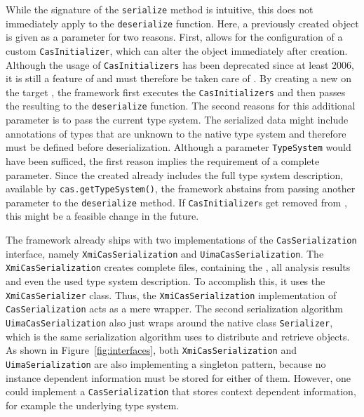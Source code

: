 While the signature of the \lstinline|serialize| method is intuitive, this does not immediately apply to the \lstinline|deserialize| function. Here, a previously created \cas{} object is given as a parameter for two reasons. First, \uima{} allows for the configuration of a custom \lstinline|CasInitializer|, which can alter the \cas{} object immediately after creation. Although the usage of \lstinline|CasInitializers| has been deprecated since at least 2006, it is still a feature of \uima{} and must therefore be taken care of \cite{uimacpe}. By creating a new \cas{} on the target \jvm{}, the framework first executes the \lstinline|CasInitializers| and then passes the resulting \cas{} to the \lstinline|deserialize| function. The second reasons for this additional parameter is to pass the current \uima{} type system. The serialized data might include annotations of types that are unknown to the native \uima{} type system and therefore must be defined before deserialization. Although a parameter \lstinline|TypeSystem| would have been sufficed, the first reason implies the requirement of a complete \cas{} parameter. Since the created \cas{} already includes the full type system description, available by \lstinline|cas.getTypeSystem()|, the framework abstains from passing another parameter to the \lstinline|deserialize| method. If \lstinline|CasInitializer|s get removed from \uima{}, this might be a feasible change in the future.

The framework already ships with two implementations of the \lstinline|CasSerialization| interface, namely \lstinline|XmiCasSerialization| and \lstinline|UimaCasSerialization|. The \lstinline|XmiCasSerialization| creates complete \xmi{} files, containing the \sofa{}, all analysis results and even the used type system description. To accomplish this, it uses the \uima{} \lstinline|XmiCasSerializer| class. Thus, the \lstinline|XmiCasSerialization| implementation of \lstinline|CasSerialization| acts as a mere wrapper. The second serialization algorithm \lstinline|UimaCasSerialization| also just wraps around the native \uima{} class \lstinline|Serializer|, which is the same serialization algorithm \uimaas{} uses to distribute and retrieve \cas{} objects. As shown in Figure~\ref{fig:interfaces}, both \lstinline|XmiCasSerialization| and \lstinline|UimaSerialization| are also implementing a singleton pattern, because no instance dependent information must be stored for either of them. However, one could implement a \lstinline|CasSerialization| that stores context dependent information, for example the underlying type system.

